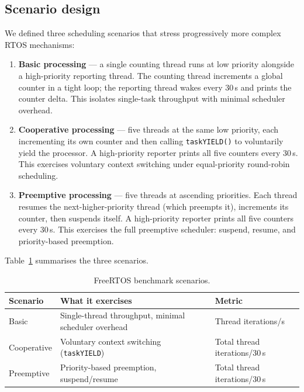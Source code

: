 \subsection{Scenario design}
\label{sec:gd32-freertos-scenarios}

We defined three scheduling scenarios that stress progressively more complex RTOS
mechanisms:

\begin{enumerate}
  \item \textbf{Basic processing} --- a single counting thread runs at low priority
    alongside a high-priority reporting thread. The counting thread increments a global
    counter in a tight loop; the reporting thread wakes every 30\,s and prints the counter
    delta. This isolates single-task throughput with minimal scheduler overhead.
  \item \textbf{Cooperative processing} --- five threads at the same low priority, each
    incrementing its own counter and then calling \texttt{taskYIELD()} to voluntarily yield
    the processor. A high-priority reporter prints all five counters every 30\,s. This
    exercises voluntary context switching under equal-priority round-robin scheduling.
  \item \textbf{Preemptive processing} --- five threads at ascending priorities. Each
    thread resumes the next-higher-priority thread (which preempts it), increments its
    counter, then suspends itself. A high-priority reporter prints all five counters every
    30\,s. This exercises the full preemptive scheduler: suspend, resume, and
    priority-based preemption.
\end{enumerate}

Table~\ref{tab:gd32-freertos-scenarios} summarises the three scenarios.

\begin{table}[H]
  \centering
  \caption{FreeRTOS benchmark scenarios.}
  \label{tab:gd32-freertos-scenarios}
  \begin{tabularx}{\textwidth}{l X l}
    \toprule
    \textbf{Scenario} & \textbf{What it exercises} & \textbf{Metric} \\
    \midrule
    Basic        & Single-thread throughput, minimal scheduler overhead
                 & Thread iterations/s \\
    Cooperative  & Voluntary context switching (\texttt{taskYIELD})
                 & Total thread iterations/30\,s \\
    Preemptive   & Priority-based preemption, suspend/resume
                 & Total thread iterations/30\,s \\
    \bottomrule
  \end{tabularx}
\end{table}

